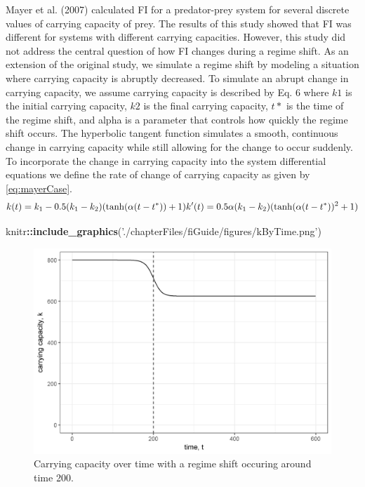 \documentclass[12pt,twoside,openany]{reedthesis}
\newenvironment{Shaded}{\begin{snugshade}}{\end{snugshade}}
\newcommand{\KeywordTok}[1]{\textcolor[rgb]{0.13,0.29,0.53}{\textbf{#1}}}
\newcommand{\StringTok}[1]{\textcolor[rgb]{0.31,0.60,0.02}{#1}}
\newcommand{\OperatorTok}[1]{\textcolor[rgb]{0.81,0.36,0.00}{\textbf{#1}}}
\newcommand{\NormalTok}[1]{#1}
\begin{document}
Mayer et al. (2007) calculated FI for a predator-prey system for several
discrete values of carrying capacity of prey. The results of this study
showed that FI was different for systems with different carrying
capacities. However, this study did not address the central question of
how FI changes during a regime shift. As an extension of the original
study, we simulate a regime shift by modeling a situation where carrying
capacity is abruptly decreased. To simulate an abrupt change in carrying
capacity, we assume carrying capacity is described by Eq. 6 where \(k1\)
is the initial carrying capacity, \(k2\) is the final carrying capacity,
\(t*\) is the time of the regime shift, and alpha is a parameter that
controls how quickly the regime shift occurs. The hyperbolic tangent
function simulates a smooth, continuous change in carrying capacity
while still allowing for the change to occur suddenly. To incorporate
the change in carrying capacity into the system differential equations
we define the rate of change of carrying capacity as given by
\eqref{eq:mayerCase}.\\
\begin{equation}  
  k(t) = k_1  - 0.5(k_1-k_2)(\tanh(\alpha (t-t^*))+1)     \\
  k'(t) = 0.5\alpha (k_1-k_2)(\tanh(\alpha(t-t^*))^2 +1)      \\ 
\label{eq:mayerCase}
\end{equation}
\begin{Shaded}
\begin{Highlighting}[]
\NormalTok{knitr}\OperatorTok{::}\KeywordTok{include_graphics}\NormalTok{(}\StringTok{'./chapterFiles/fiGuide/figures/kByTime.png'}\NormalTok{)}
\end{Highlighting}
\end{Shaded}
\begin{figure}
\includegraphics[width=27.08in]{./chapterFiles/fiGuide/figures/kByTime} \caption{Carrying capacity over time with a regime shift occuring around time 200.}\label{fig:kByTime}
\end{figure}
\end{document}
